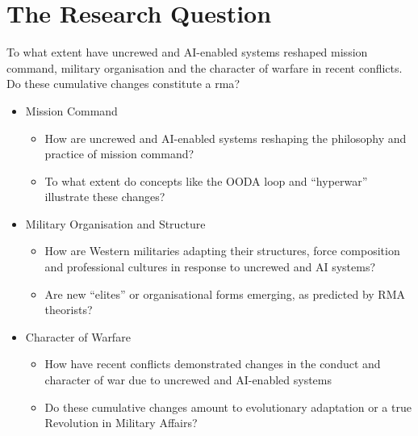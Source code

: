 \chapter{The Research Question}


To what extent have uncrewed and AI-enabled systems reshaped mission command, military organisation and the character of warfare in recent conflicts. Do these cumulative changes constitute a \gls{rma}?

\begin{itemize}
	\item Mission Command
		\begin{itemize}
		\item How are uncrewed and AI-enabled systems reshaping the philosophy and practice of mission command?
		\item To what extent do concepts like the OODA loop and ``hyperwar” illustrate these changes?
		\end{itemize}
	\item Military Organisation and Structure
		\begin{itemize}
			\item How are Western militaries adapting their structures, force composition and professional cultures in response to uncrewed and AI systems?
			\item Are new ``elites” or organisational forms emerging, as predicted by RMA theorists?
		\end{itemize}
	\item Character of Warfare
		\begin{itemize}
			\item How have recent conflicts demonstrated changes in the conduct and character of war due to uncrewed and AI-enabled systems
			\item Do these cumulative changes amount to evolutionary adaptation or a true Revolution in Military Affairs?
		\end{itemize}
\end{itemize}
